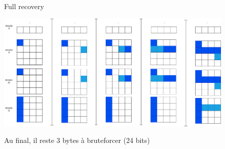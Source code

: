 \begin{frame}{Full recovery}
    \begin{center}
        \includegraphics[width=0.85\textwidth]{img/sca/aes-distrace/full_recovery.png}
    \end{center}
    \pause
    
    Au final, il reste 3 bytes à bruteforcer (24 bits) \flag
\end{frame}
